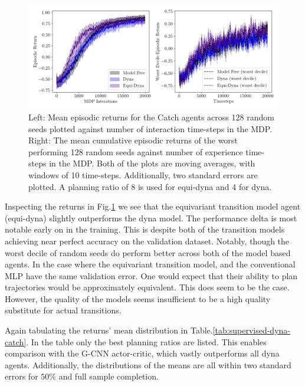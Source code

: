 \begin{figure}
	\centering
	\includegraphics[width=\textwidth]{Figures/Expert_dyna_catch_best.png}
	\caption{Left: Mean episodic returns for the Catch agents across 128 random seeds
		plotted against number of interaction time-steps in the MDP. Right: The mean
		cumulative episodic returns of the worst performing 128 random seeds against
		number of experience time-steps in the MDP. Both of the plots are moving
		averages, with windows of 10 time-steps. Additionally, two standard errors are
		plotted. A planning ratio of 8 is used for equi-dyna and 4 for dyna.}
	\label{fig:supervised-dyna-catch}
\end{figure}

Inspecting the returns in Fig.\ref{fig:supervised-dyna-catch} we see that the equivariant transition model agent (equi-dyna) slightly outperforms the dyna model. The performance delta is most notable early on in the training. This is despite both of the transition models achieving near perfect accuracy on the validation dataset. Notably, though the worst decile of random seeds do perform better across both of the model based agents. In the case where the equivariant transition model, and the conventional MLP have the same validation error. One would expect that their ability to plan trajectories would be approximately equivalent. This does seem to be the case. However, the quality of the models seems insufficient to be a high quality substitute for actual transitions.

Again tabulating the returns' mean distribution in Table.\ref{tab:supervised-dyna-catch}. In the table only the best planning ratios are listed. This enables comparison with the G-CNN actor-critic, which vastly outperforms all dyna agents. Additionally, the distributions of the means are all within two standard errors for $50 \%$ and full sample completion.

